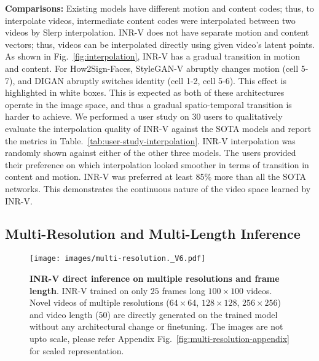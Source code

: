 \documentclass[10pt]{article} \usepackage[accepted]{tmlr}
\begin{document}
\textbf{Comparisons: } Existing models have different motion and content codes; thus, to interpolate videos, intermediate content codes were interpolated between two videos by Slerp interpolation. INR-V does not have separate motion and content vectors; thus, videos can be interpolated directly using given video's latent points. As shown in Fig.~\ref{fig:interpolation}, INR-V has a gradual transition in motion and content. For How2Sign-Faces, StyleGAN-V abruptly changes motion (cell 5-7), and DIGAN abruptly switches identity (cell 1-2, cell 5-6). This effect is highlighted in white boxes. This is expected as both of these architectures operate in the image space, and thus a gradual spatio-temporal transition is harder to achieve. We performed a user study on $30$ users to qualitatively evaluate the interpolation quality of INR-V against the SOTA models and report the metrics in Table.~\ref{tab:user-study-interpolation}. 
INR-V interpolation was randomly shown against either of the other three models. 
The users provided their preference on which interpolation looked smoother in terms of transition in content and motion. INR-V was preferred at least 85\% more than all the SOTA networks. This demonstrates the continuous nature of the video space learned by INR-V. 

\subsection{Multi-Resolution and Multi-Length Inference}
\label{sec:multi-res-section}
\begin{figure}
  \centering
  \texttt{[image: images/multi-resolution.\_V6.pdf]}
  \caption{\textbf{INR-V direct inference on multiple resolutions and frame length}.  INR-V trained on only $25$ frames long $100 \times 100$ videos. Novel videos of multiple resolutions ($64 \times 64$, $128 \times 128$, $256 \times 256$) and video length ($50$) are directly generated on the trained model without any architectural change or finetuning. The images are not upto scale, please refer Appendix Fig.~\ref{fig:multi-resolution-appendix} for scaled representation.}
  \label{fig:multi-scale}
\end{figure}
\end{document}
